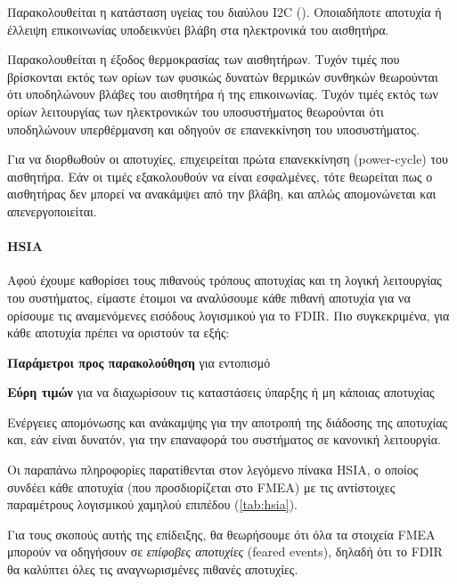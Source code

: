 \documentclass[a4paper,nobib]{tufte-book}
\begin{document}
\begin{compactenum}
	\item Παρακολουθείται η κατάσταση υγείας του διαύλου \ac{I2C} (). Οποιαδήποτε αποτυχία ή έλλειψη επικοινωνίας υποδεικνύει βλάβη στα ηλεκτρονικά του αισθητήρα.
	\item Παρακολουθείται η έξοδος θερμοκρασίας των αισθητήρων. Τυχόν τιμές που βρίσκονται εκτός των ορίων των φυσικώς δυνατών θερμικών συνθηκών θεωρούνται ότι υποδηλώνουν βλάβες του αισθητήρα ή της επικοινωνίας. Τυχόν τιμές εκτός των ορίων λειτουργίας των ηλεκτρονικών του υποσυστήματος θεωρούνται ότι υποδηλώνουν υπερθέρμανση και οδηγούν σε επανεκκίνηση του υποσυστήματος.
	\item Για να διορθωθούν οι αποτυχίες, επιχειρείται πρώτα επανεκκίνηση (power-cycle) του αισθητήρα. Εάν οι τιμές εξακολουθούν να είναι εσφαλμένες, τότε θεωρείται πως ο αισθητήρας δεν μπορεί να ανακάμψει από την βλάβη, και απλώς απομονώνεται και απενεργοποιείται.
\end{compactenum}

\paragraph{\acl{HSIA}}

Αφού έχουμε καθορίσει τους πιθανούς τρόπους αποτυχίας και τη λογική λειτουργίας του συστήματος, είμαστε έτοιμοι να αναλύσουμε κάθε πιθανή αποτυχία για να ορίσουμε τις αναμενόμενες εισόδους λογισμικού για το \ac{FDIR}. Πιο συγκεκριμένα, για κάθε αποτυχία πρέπει να οριστούν τα εξής: \autocite[84]{SAVOIR-HB-003}
\begin{compactitem}
	\item \textbf{Παράμετροι προς παρακολούθηση} για εντοπισμό
	\item \textbf{Εύρη τιμών} για να διαχωρίσουν τις καταστάσεις ύπαρξης ή μη κάποιας αποτυχίας
	\item Ενέργειες απομόνωσης και ανάκαμψης για την αποτροπή της διάδοσης της αποτυχίας και, εάν είναι δυνατόν, για την επαναφορά του συστήματος σε κανονική λειτουργία.
\end{compactitem}

Οι παραπάνω πληροφορίες παρατίθενται στον λεγόμενο πίνακα \acf{HSIA}, ο οποίος συνδέει κάθε αποτυχία (που προσδιορίζεται στο \acl{FMEA}) με τις αντίστοιχες παραμέτρους λογισμικού χαμηλού επιπέδου (\cref{tab:hsia}).

Για τους σκοπούς αυτής της επίδειξης, θα θεωρήσουμε ότι όλα τα στοιχεία \ac{FMEA} μπορούν να οδηγήσουν σε \emph{επίφοβες αποτυχίες} (feared events), δηλαδή ότι το \ac{FDIR} θα καλύπτει όλες τις αναγνωρισμένες πιθανές αποτυχίες.
\end{document}
